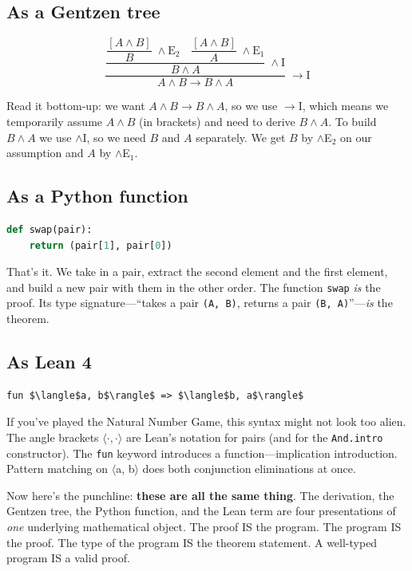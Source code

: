 \documentclass[11pt]{article}
\begin{document}
\subsection{As a Gentzen tree}

\[
\dfrac{
  \dfrac{
    \dfrac{[A \wedge B]}{B}\;\wedge\text{E}_2
    \quad
    \dfrac{[A \wedge B]}{A}\;\wedge\text{E}_1
  }{B \wedge A}\;\wedge\text{I}
}{A \wedge B \to B \wedge A}\;\to\text{I}
\]

Read it bottom-up: we want $A \wedge B \to B \wedge A$, so we use $\to$I, which means we temporarily assume $A \wedge B$ (in brackets) and need to derive $B \wedge A$. To build $B \wedge A$ we use $\wedge$I, so we need $B$ and $A$ separately. We get $B$ by $\wedge$E$_2$ on our assumption and $A$ by $\wedge$E$_1$.

\subsection{As a Python function}

\begin{lstlisting}[language=Python]
def swap(pair):
    return (pair[1], pair[0])
\end{lstlisting}

That's it. We take in a pair, extract the second element and the first element, and build a new pair with them in the other order. The function \texttt{swap} \emph{is} the proof. Its type signature---``takes a pair \texttt{(A, B)}, returns a pair \texttt{(B, A)}''---\emph{is} the theorem.

\subsection{As Lean 4}

\begin{lstlisting}
fun $\langle$a, b$\rangle$ => $\langle$b, a$\rangle$
\end{lstlisting}

If you've played the Natural Number Game, this syntax might not look too alien. The angle brackets $\langle\cdot, \cdot\rangle$ are Lean's notation for pairs (and for the \texttt{And.intro} constructor). The \texttt{fun} keyword introduces a function---implication introduction. Pattern matching on $\langle$a, b$\rangle$ does both conjunction eliminations at once.

\bigskip

Now here's the punchline: \textbf{these are all the same thing}. The derivation, the Gentzen tree, the Python function, and the Lean term are four presentations of \emph{one} underlying mathematical object. The proof IS the program. The program IS the proof. The type of the program IS the theorem statement. A well-typed program IS a valid proof.
\end{document}
